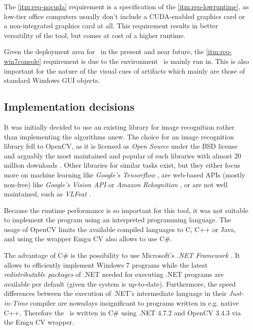 The \ref{itm:req-nocuda} requirement is a specification of the \ref{itm:req-lowruntime}, as low-tier office computers usually don't include a CUDA-enabled graphics card or a non-integrated graphics card at all. This requirement results in better versatility of the tool, but comes at cost of a higher runtime.

Given the deployment area for \ape~in the present and near future, the \ref{itm:req-win7console} requirement is due to the environment \ape~is mainly run in. This is also important for the nature of the visual cues of artifacts which mainly are those of standard Windows GUI objects.

\subsection{Implementation decisions}

It was initially decided to use an existing library for image recognition rather than implementing the algorithms anew. The choice for an image recognition library fell to OpenCV, as it is licensed as \emph{Open Source} under the BSD license and arguably the most maintained and popular of such libraries with almost 20 million downloads \cite{opencv_downloads}. Other libraries for similar tasks exist, but they either focus more on machine learning like \emph{Google's Tensorflow} \cite{tensorflow}, are web-based APIs (mostly non-free) like \emph{Google's Vision API} \cite{vision_api} or \emph{Amazon Rekognition} \cite{rekognition}, or are not well maintained, such as \emph{VLFeat} \cite{vlfeat}.

Because the runtime performance is so important for this tool, it was not suitable to implement the program using an interpreted programming language. The usage of OpenCV limits the available compiled languages to C, C++ or Java, and using the wrapper Emgu CV also allows to use C\#.

The advantage of C\# is the possibility to use Microsoft's \emph{.NET Framework} \cite{dotnet4_7_2}. It allows to efficiently implement Windows 7 programs while the latest \emph{redistributable packages} of .NET needed for executing .NET programs are available per default (given the system is up-to-date). Furthermore, the speed differences between the execution of .NET's intermediate language in their \emph{Just-in-Time} compiler are nowadays insignificant to programs written in e.g. native C++. Therefore the \vd~is written in C\# using .NET 4.7.2 and OpenCV 3.4.3 via the Emgu CV wrapper.

